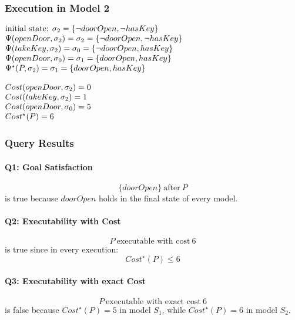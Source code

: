\documentclass[11pt]{article}
\makeatletter
\newenvironment{centeredleftblock}[1][0.78\textwidth]
{\begin{center}\begin{minipage}{#1}\raggedright}
{\end{minipage}\end{center}}
\newenvironment{statementblock}
{\begin{flushleft}\renewcommand{\arraystretch}{1.1}\(\begin{array}{@{}l@{}}}
{\end{array}\)\end{flushleft}}
\makeatother
\begin{document}
\subsubsection*{Execution in Model 2}
\begin{centeredleftblock}[0.9\textwidth]
\noindent
\begin{minipage}[t]{0.64\linewidth}
\begin{statementblock}
\text{initial state: } \sigma_2 = \{\neg doorOpen, \neg hasKey\} \\
\Psi(openDoor, \sigma_2) = \sigma_2 = \{\neg doorOpen, \neg hasKey\} \\
\Psi(takeKey, \sigma_2) = \sigma_0 = \{\neg doorOpen, hasKey\} \\
\Psi(openDoor, \sigma_0) = \sigma_1 = \{doorOpen, hasKey\} \\
\Psi^\star(P, \sigma_2) = \sigma_1 = \{doorOpen, hasKey\}
\end{statementblock}
\end{minipage}
\hfill
\begin{minipage}[t]{0.28\linewidth}
\begin{statementblock}
Cost(openDoor, \sigma_2) = 0 \\
Cost(takeKey, \sigma_2) = 1 \\
Cost(openDoor, \sigma_0) = 5 \\
Cost^\star(P) = 6
\end{statementblock}
\end{minipage}
\end{centeredleftblock}

\subsubsection*{Query Results}

\paragraph{Q1: Goal Satisfaction}
\[
\{doorOpen\} ~\text{after}~ P
\]
is true because $doorOpen$ holds in the final state of every model.

\paragraph{Q2: Executability with Cost}
\[
P ~\text{executable with cost}~ 6
\]
is true since in every execution:
\[
Cost^\star(P) \leq 6
\]

\paragraph{Q3: Executability with exact Cost}
\[
P ~\text{executable with exact cost}~ 6
\]
is false because \(Cost^\star(P) = 5\) in model \(S_1\), while
\(Cost^\star(P) = 6\) in model \(S_2\).
\end{document}
